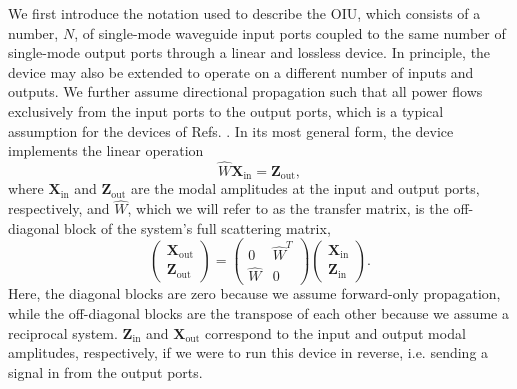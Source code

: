 We first introduce the notation used to describe the OIU, which consists of a number, $N$, of single-mode waveguide input ports coupled to the same number of single-mode output ports through a linear and lossless device. In principle, the device may also be extended to operate on a different number of inputs and outputs. We further assume directional propagation such that all power flows exclusively from the input ports to the output ports, which is a typical assumption for the devices of Refs. \cite{Miller2013a, shen2017deep, Harris2017, Carolan2015, Reck1994,miller_selfconfiguring_2013,Clements2016}. In its most general form, the device implements the linear operation
\begin{equation}
\hat{W}\mathbf{X}_\textrm{in} = \mathbf{Z}_\textrm{out},
\label{eq:original_linear_system}
\end{equation}
where $\mathbf{X}_\textrm{in}$ and $\mathbf{Z}_\textrm{out}$ are the modal amplitudes at the input and output ports, respectively, and $\hat{W}$, which we will refer to as the transfer matrix, is the off-diagonal block of the system's full scattering matrix,
\begin{equation}
\begin{pmatrix}
\mathbf{X}_\textrm{out} \\
\mathbf{Z}_\textrm{out}
\end{pmatrix} = \begin{pmatrix}
0 & \hat{W}^T \\
\hat{W} & 0
\end{pmatrix}  
\begin{pmatrix}
\mathbf{X}_\textrm{in} \\
\mathbf{Z}_\textrm{in}
\end{pmatrix}.
\label{eq:smatrix}
\end{equation}
Here, the diagonal blocks are zero because we assume forward-only propagation, while the off-diagonal blocks are the transpose of each other because we assume a reciprocal system. $\mathbf{Z}_\textrm{in}$ and $\mathbf{X}_\textrm{out}$ correspond to the input and output modal amplitudes, respectively, if we were to run this device in reverse, i.e. sending a signal in from the output ports.


